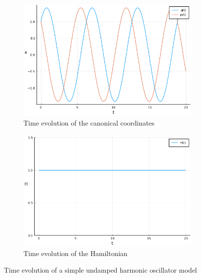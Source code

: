 \documentclass[
	parskip, 			   %
	twoside, 			   %
	DIV=14, 			   %
	BCOR=15.0mm, 		   %
	headsepline, 		   %
	open=right, 		   %
	captions=tableheading, %
	bibliography=totoc,    %
	numbers=noenddot       %
]{scrreprt}
\begin{document}
\clearpage
\begin{figure}[h!]
    \centering
    \begin{subfigure}{1\textwidth}
        \centering
        \includegraphics[scale=0.8]{figures/udho_time_evolution.png}
        \caption{Time evolution of the canonical coordinates}
        \label{fig:simulation_udho}
    \end{subfigure}
    \vspace{1em}
    \begin{subfigure}{1\textwidth}
        \centering
        \includegraphics[scale=0.8]{figures/udho_time_evolution_Hamiltonian.png}
        \caption{Time evolution of the Hamiltonian}
        \label{fig:Hamiltonian_udho}
    \end{subfigure}
    \caption{Time evolution of a simple undamped harmonic oscillator model}
    \label{fig:time_evolution_udho}
\end{figure}
\end{document}

